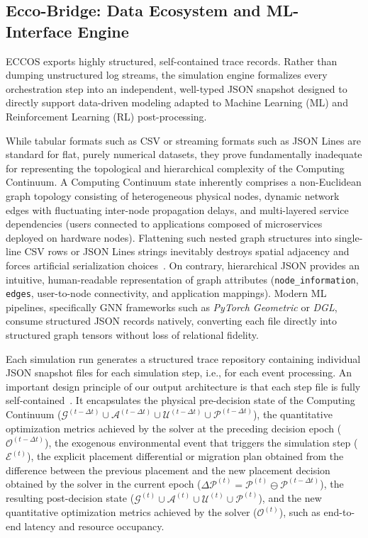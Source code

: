 \documentclass[ASNA]{USG} %
\begin{document}
\subsection{Ecco-Bridge: Data Ecosystem and ML-Interface Engine}
\label{subsec:eccobridge}

\textsc{ECCOS} exports highly structured, self-contained trace records. Rather than dumping unstructured log streams, the simulation engine formalizes every orchestration step into an independent, well-typed JSON snapshot designed to directly support data-driven modeling adapted to Machine Learning (ML) and Reinforcement Learning (RL) post-processing.

While tabular formats such as CSV or streaming formats such as JSON Lines are standard for flat, purely numerical datasets, they prove fundamentally inadequate for representing the topological and hierarchical complexity of the Computing Continuum. A Computing Continuum state inherently comprises a non-Euclidean graph topology consisting of heterogeneous physical nodes, dynamic network edges with fluctuating inter-node propagation delays, and multi-layered service dependencies (users connected to applications composed of microservices deployed on hardware nodes). Flattening such nested graph structures into single-line CSV rows or JSON Lines strings inevitably destroys spatial adjacency and forces artificial serialization choices~\cite{Peng2025Unifying}. On contrary, hierarchical JSON provides an intuitive, human-readable representation of graph attributes (\texttt{node\_information}, \texttt{edges}, user-to-node connectivity, and application mappings). Modern ML pipelines, specifically GNN frameworks such as \emph{PyTorch Geometric} or \emph{DGL}, consume structured JSON records natively, converting each file directly into structured graph tensors without loss of relational fidelity.


Each simulation run generates a structured trace repository containing individual JSON snapshot files for each simulation step, i.e., for each event processing. An important design principle of our output architecture is that each step file is fully self-contained~\cite{Zhang2023Efficient}. It encapsulates the physical pre-decision state of the Computing Continuum ($\mathcal{G}^{(t-\Delta t)} \cup \mathcal{A}^{(t-\Delta t)} \cup \mathcal{U}^{(t-\Delta t)} \cup \mathcal{P}^{(t-\Delta t)}$), the quantitative optimization metrics achieved by the solver at the preceding decision epoch ($\mathcal{O}^{(t-\Delta t)}$), the exogenous environmental event that triggers the simulation step ($\mathcal{E}^{(t)}$), the explicit placement differential or migration plan  obtained from the difference between the previous placement and the new  placement decision obtained by the solver in the current epoch ($\Delta \mathcal{P}^{(t)} = \mathcal{P}^{(t)} \ominus \mathcal{P}^{(t-\Delta t)}$), the resulting post-decision state ($\mathcal{G}^{(t)} \cup \mathcal{A}^{(t)} \cup \mathcal{U}^{(t)} \cup \mathcal{P}^{(t)}$), and the new quantitative optimization metrics achieved by the solver ($\mathcal{O}^{(t)}$), such as end-to-end latency and resource occupancy.
\end{document}
